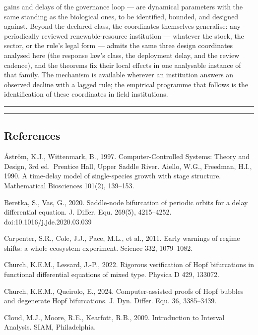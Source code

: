 \documentclass[11pt]{article}
\begin{document}
gains and delays of the governance loop --- are dynamical parameters
with the same standing as the biological ones, to be identified,
bounded, and designed against. Beyond the declared class, the
coordinates themselves generalise: any periodically reviewed
renewable-resource institution --- whatever the stock, the sector, or
the rule's legal form --- admits the same three design coordinates
analysed here (the response law's class, the deployment delay, and the
review cadence), and the theorems fix their local effects in one
analysable instance of that family. The mechanism is available wherever
an institution answers an observed decline with a lagged rule; the
empirical programme that follows is the identification of these
coordinates in field institutions.

\begin{center}\rule{0.5\linewidth}{0.5pt}\end{center}

\begin{center}\rule{0.5\linewidth}{0.5pt}\end{center}

\subsection{References}\label{references}

\AA{}str\"om, K.J., Wittenmark, B., 1997. Computer-Controlled Systems: Theory
and Design, 3rd ed.~Prentice Hall, Upper Saddle River. Aiello, W.G.,
Freedman, H.I., 1990. A time-delay model of single-species growth with
stage structure. Mathematical Biosciences 101(2), 139--153.

Beretka, S., Vas, G., 2020. Saddle-node bifurcation of periodic orbits
for a delay differential equation. J. Differ. Equ. 269(5), 4215--4252.
doi:10.1016/j.jde.2020.03.039

Carpenter, S.R., Cole, J.J., Pace, M.L., et al., 2011. Early warnings of
regime shifts: a whole-ecosystem experiment. Science 332, 1079--1082.

Church, K.E.M., Lessard, J.-P., 2022. Rigorous verification of Hopf
bifurcations in functional differential equations of mixed type. Physica
D 429, 133072.

Church, K.E.M., Queirolo, E., 2024. Computer-assisted proofs of Hopf
bubbles and degenerate Hopf bifurcations. J. Dyn. Differ. Equ. 36,
3385--3439.

Cloud, M.J., Moore, R.E., Kearfott, R.B., 2009. Introduction to Interval
Analysis. SIAM, Philadelphia.
\end{document}

